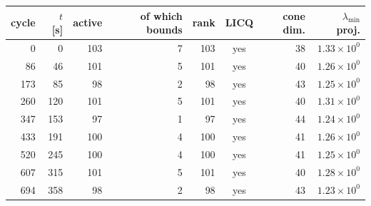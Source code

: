 \begin{tabular}{rrrrrcrr}
  \toprule
  cycle & $t$ [s] & active & of which bounds & rank & LICQ & cone dim. & $\lambda_{\min}$ proj. \\
  \midrule
  0 & 0 & 103 & 7 & 103 & yes & 38 & $1.33\times 10^{0}$ \\
  86 & 46 & 101 & 5 & 101 & yes & 40 & $1.26\times 10^{0}$ \\
  173 & 85 & 98 & 2 & 98 & yes & 43 & $1.25\times 10^{0}$ \\
  260 & 120 & 101 & 5 & 101 & yes & 40 & $1.31\times 10^{0}$ \\
  347 & 153 & 97 & 1 & 97 & yes & 44 & $1.24\times 10^{0}$ \\
  433 & 191 & 100 & 4 & 100 & yes & 41 & $1.26\times 10^{0}$ \\
  520 & 245 & 100 & 4 & 100 & yes & 41 & $1.25\times 10^{0}$ \\
  607 & 315 & 101 & 5 & 101 & yes & 40 & $1.28\times 10^{0}$ \\
  694 & 358 & 98 & 2 & 98 & yes & 43 & $1.23\times 10^{0}$ \\
  \bottomrule
\end{tabular}
